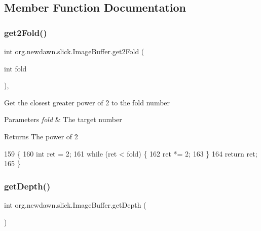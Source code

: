 \subsection{Member Function Documentation}
\mbox{\label{classorg_1_1newdawn_1_1slick_1_1_image_buffer_aeeb1bc84ab69d8175db88425c42f9945}} 
\subsubsection{\texorpdfstring{get2\+Fold()}{get2Fold()}}
{\footnotesize\ttfamily int org.\+newdawn.\+slick.\+Image\+Buffer.\+get2\+Fold (\begin{DoxyParamCaption}\item[{int}]{fold }\end{DoxyParamCaption})\hspace{0.3cm}{\ttfamily [inline]}, {\ttfamily [private]}}

Get the closest greater power of 2 to the fold number


\begin{DoxyParams}{Parameters}
{\em fold} & The target number \\
\hline
\end{DoxyParams}
\begin{DoxyReturn}{Returns}
The power of 2 
\end{DoxyReturn}

\begin{DoxyCode}
159                                    \{
160         \textcolor{keywordtype}{int} ret = 2;
161         \textcolor{keywordflow}{while} (ret < fold) \{
162             ret *= 2;
163         \}
164         \textcolor{keywordflow}{return} ret;
165     \}
\end{DoxyCode}
\mbox{\label{classorg_1_1newdawn_1_1slick_1_1_image_buffer_af74cb0da09fe9e93dc1ff79547c2b608}} 
\subsubsection{\texorpdfstring{get\+Depth()}{getDepth()}}
{\footnotesize\ttfamily int org.\+newdawn.\+slick.\+Image\+Buffer.\+get\+Depth (\begin{DoxyParamCaption}{ }\end{DoxyParamCaption})\hspace{0.3cm}{\ttfamily [inline]}}

